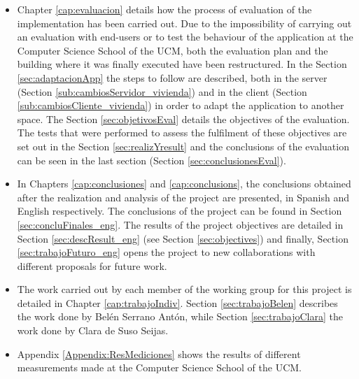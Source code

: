 \begin{itemize}
	\item Chapter \ref{cap:evaluacion} details how the process of evaluation of the implementation has been carried out. Due to the impossibility of carrying out an evaluation with end-users or to test the behaviour of the application at the Computer Science School of the UCM, both the evaluation plan and the building where it was finally executed have been restructured. In the Section \ref{sec:adaptacionApp} the steps to follow are described, both in the server (Section \ref{sub:cambiosServidor_vivienda}) and in the client (Section \ref{sub:cambiosCliente_vivienda}) in order to adapt the application to another space. The Section \ref{sec:objetivosEval} details the objectives of the evaluation. The tests that were performed to assess the fulfilment of these objectives are set out in the Section \ref{sec:realizYresult} and the conclusions of the evaluation can be seen in the last section (Section \ref{sec:conclusionesEval}).
	
	\item In Chapters \ref{cap:conclusiones} and \ref{cap:conclusions}, the conclusions obtained after the realization and analysis of the project are presented, in Spanish and English respectively. The conclusions of the project can be found in Section \ref{sec:concluFinales_eng}. The results of the project objectives are detailed in Section \ref{sec:descResult_eng} (see Section \ref{sec:objectives}) and finally, Section \ref{sec:trabajoFuturo_eng} opens the project to new collaborations with different proposals for future work.
	
	\item The work carried out by each member of the working group for this project is detailed in Chapter \ref{cap:trabajoIndiv}. Section \ref{sec:trabajoBelen} describes the work done by Belén Serrano Antón, while Section \ref{sec:trabajoClara} the work done by Clara de Suso Seijas.
	
	\item Appendix \ref{Appendix:ResMediciones} shows the results of different measurements made at the Computer Science School of the UCM.
	
\end{itemize}










